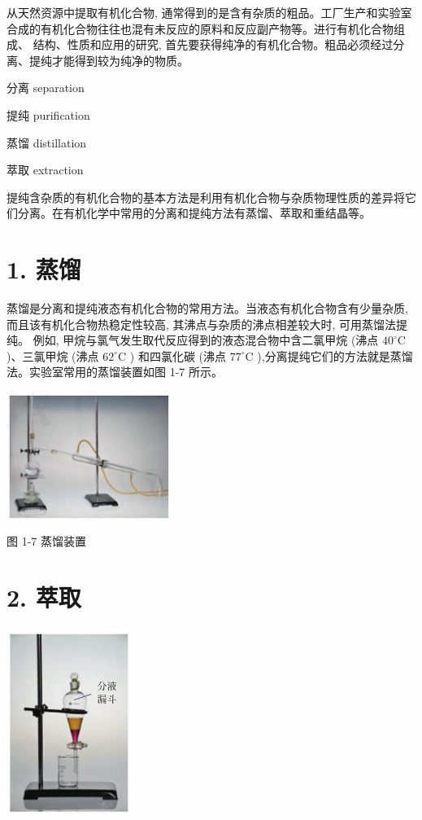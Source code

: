 \documentclass[10pt]{article}
\begin{document}
从天然资源中提取有机化合物, 通常得到的是含有杂质的粗品。工厂生产和实验室合成的有机化合物往往也混有未反应的原料和反应副产物等。进行有机化合物组成、 结构、性质和应用的研究, 首先要获得纯净的有机化合物。粗品必须经过分离、提纯才能得到较为纯净的物质。

\begin{mdframed}

分离 separation

提纯 purification

蒸馏 distillation

萃取 extraction

\end{mdframed}

提纯含杂质的有机化合物的基本方法是利用有机化合物与杂质物理性质的差异将它们分离。在有机化学中常用的分离和提纯方法有蒸馏、萃取和重结晶等。

\section*{1. 蒸馏}

蒸馏是分离和提纯液态有机化合物的常用方法。当液态有机化合物含有少量杂质, 而且该有机化合物热稳定性较高, 其沸点与杂质的沸点相差较大时, 可用蒸馏法提纯。 例如, 甲烷与氯气发生取代反应得到的液态混合物中含二氯甲烷 (沸点 \({40}^{ \circ }\mathrm{C}\) )、三氯甲烷 (沸点 \({62}^{ \circ }\mathrm{C}\) ) 和四氯化碳 (沸点 \({77}^{ \circ }\mathrm{C}\) ),分离提纯它们的方法就是蒸馏法。实验室常用的蒸馏装置如图 1-7 所示。

\begin{center}
\includegraphics[max width=0.4\textwidth]{images/0190efc5-b58a-7c43-bfb0-e0a030df9cfd_18_862312.jpg}
\end{center}

图 1-7 蒸馏装置

\section*{2. 萃取}

\begin{center}
\includegraphics[max width=0.3\textwidth]{images/0190efc5-b58a-7c43-bfb0-e0a030df9cfd_19_222321.jpg}
\end{center}
\end{document}
